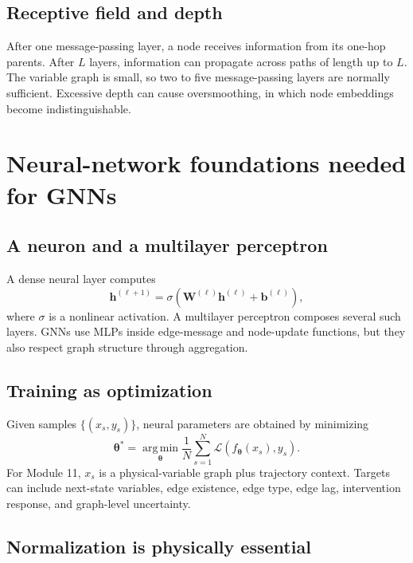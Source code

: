 \documentclass[11pt]{article}
\newcommand{\Lcal}{\mathcal{L}}
\newcommand{\Wmat}{\bm{W}}
\newcommand{\hvec}{\bm{h}}
\newcommand{\thetavec}{\bm{\theta}}
\newcommand{\argmin}{\operatorname*{arg\,min}}
\begin{document}
\subsection{Receptive field and depth}

After one message-passing layer, a node receives information from its one-hop parents. After \(L\) layers, information can propagate across paths of length up to \(L\). The variable graph is small, so two to five message-passing layers are normally sufficient. Excessive depth can cause oversmoothing, in which node embeddings become indistinguishable.

\section{Neural-network foundations needed for GNNs}

\subsection{A neuron and a multilayer perceptron}

A dense neural layer computes
\begin{equation}
\hvec^{(\ell+1)}=\sigma\left(\Wmat^{(\ell)}\hvec^{(\ell)}+\bm{b}^{(\ell)}\right),
\end{equation}
where \(\sigma\) is a nonlinear activation. A multilayer perceptron composes several such layers. GNNs use MLPs inside edge-message and node-update functions, but they also respect graph structure through aggregation.

\subsection{Training as optimization}

Given samples \(\{(x_s,y_s)\}\), neural parameters are obtained by minimizing
\begin{equation}
\thetavec^*=\argmin_{\thetavec}\frac{1}{N}\sum_{s=1}^{N}\Lcal\left(f_{\thetavec}(x_s),y_s\right).
\end{equation}
For Module 11, \(x_s\) is a physical-variable graph plus trajectory context. Targets can include next-state variables, edge existence, edge type, edge lag, intervention response, and graph-level uncertainty.

\subsection{Normalization is physically essential}
\end{document}
